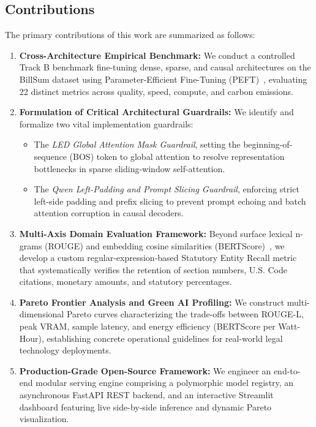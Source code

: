 \documentclass[conference]{IEEEtran}
\begin{document}
\subsection{Contributions}
The primary contributions of this work are summarized as follows:
\begin{enumerate}
    \item \textbf{Cross-Architecture Empirical Benchmark:} We conduct a controlled Track B benchmark fine-tuning dense, sparse, and causal architectures on the BillSum dataset using Parameter-Efficient Fine-Tuning (PEFT)~\cite{hu2021lora}, evaluating 22 distinct metrics across quality, speed, compute, and carbon emissions.
    \item \textbf{Formulation of Critical Architectural Guardrails:} We identify and formalize two vital implementation guardrails:
    \begin{itemize}
        \item The \textit{LED Global Attention Mask Guardrail}, setting the beginning-of-sequence (BOS) token to global attention to resolve representation bottlenecks in sparse sliding-window self-attention.
        \item The \textit{Qwen Left-Padding and Prompt Slicing Guardrail}, enforcing strict left-side padding and prefix slicing to prevent prompt echoing and batch attention corruption in causal decoders.
    \end{itemize}
    \item \textbf{Multi-Axis Domain Evaluation Framework:} Beyond surface lexical n-grams (ROUGE) and embedding cosine similarities (BERTScore)~\cite{zhang2019bertscore}, we develop a custom regular-expression-based Statutory Entity Recall metric that systematically verifies the retention of section numbers, U.S. Code citations, monetary amounts, and statutory percentages.
    \item \textbf{Pareto Frontier Analysis and Green AI Profiling:} We construct multi-dimensional Pareto curves characterizing the trade-offs between ROUGE-L, peak VRAM, sample latency, and energy efficiency (BERTScore per Watt-Hour), establishing concrete operational guidelines for real-world legal technology deployments.
    \item \textbf{Production-Grade Open-Source Framework:} We engineer an end-to-end modular serving engine comprising a polymorphic model registry, an asynchronous FastAPI REST backend, and an interactive Streamlit dashboard featuring live side-by-side inference and dynamic Pareto visualization.
\end{enumerate}
\end{document}
